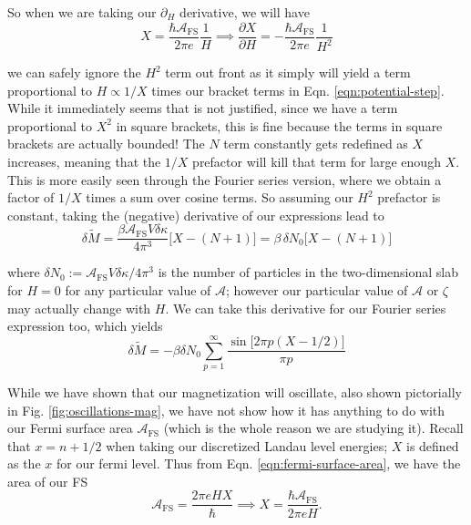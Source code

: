 \documentclass[12pt]{revtex4-2}
\begin{document}
So when we are taking our $\partial_H$ derivative, we will have
\begin{equation}
    X = \frac{\hbar\mathcal{A}_\text{FS}}{2\pi e}\frac{1}{H} \implies \frac{\partial X}{\partial H} = -\frac{\hbar\mathcal{A}_\text{FS}}{2\pi e} \frac{1}{H^2}
\end{equation}

we can safely ignore the $H^2$ term out front as it simply will yield a term proportional to $H \propto 1/X$ times our bracket terms in Eqn. \ref{eqn:potential-step}.  While it immediately seems that is not justified, since we have a term proportional to $X^2$ in square brackets, this is fine because the terms in square brackets are actually bounded!  The $N$ term constantly gets redefined as $X$ increases, meaning that the $1/X$ prefactor will kill that term for large enough $X$.  This is more easily seen through the Fourier series version, where we obtain a factor of $1/X$ times a sum over cosine terms.  So assuming our $H^2$ prefactor is constant, taking the (negative) derivative of our expressions lead to
\begin{equation}
    \boxed{ \delta \tilde{M} = \frac{\beta\mathcal{A}_\text{FS}V\delta\kappa}{4\pi^3} \big[ X - (N+1) \big] = \beta \, \delta N_0\big[ X - (N+1) \big]}
\end{equation}

where $\delta N_0 := \mathcal{A}_\text{FS}V\delta\kappa/4\pi^3$ is the number of particles in the two-dimensional slab for $H=0$ for any particular value of $\mathcal{A}$; however our particular value of $\mathcal{A}$ or $\zeta$ may actually change with $H$.  We can take this derivative for our Fourier series expression too, which yields
\begin{equation}
    \boxed{ \delta \tilde{M} = -\beta \delta N_0 \sum_{p=1}^\infty \frac{\sin\big[ 2\pi  p(X - 1/2) \big]}{\pi p} }
\end{equation}

While we have shown that our magnetization will oscillate, also shown pictorially in Fig. \ref{fig:oscillations-mag}, we have not show how it has anything to do with our Fermi surface area $\mathcal{A}_\text{FS}$ (which is the whole reason we are studying it).  Recall that $x = n + 1/2$ when taking our discretized Landau level energies; $X$ is defined as the $x$ for our fermi level.  Thus from Eqn. \ref{eqn:fermi-surface-area}, we have the area of our FS 
\begin{equation}
    \mathcal{A}_\text{FS} = \frac{2\pi eH X}{\hbar} \implies X = \frac{\hbar \mathcal{A}_\text{FS}}{2\pi eH}.
\end{equation}
\end{document}
